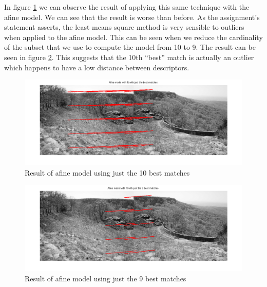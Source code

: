 In figure \ref{fig:afinebest10} we can observe the result of applying this same
technique with the afine model. We can see that the result is worse than before.
As the assignment's statement asserts, the least means square method is very
sensible to outliers when applied to the afine model. This can be seen when we
reduce the cardinality of the subset that we use to compute the model from 10 to
9. The result can be seen in figure \ref{fig:afinebest9}. This suggests that the
10th ``best'' match is actually an outlier which happens to have a low distance
between descriptors.

\begin{figure}[htb]
	\centering
		\includegraphics[width=\textwidth]{./img/ex1/afine_best_matches.png}
	\caption{Result of afine model using just the 10 best matches}
	\label{fig:afinebest10}
\end{figure}

\begin{figure}[htb]
	\centering
		\includegraphics[width=\textwidth]{./img/ex1/afine_best_matches_9.png}
	\caption{Result of afine model using just the 9 best matches}
	\label{fig:afinebest9}
\end{figure}